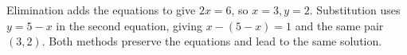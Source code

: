 Elimination adds the equations to give $2x=6$, so $x=3,y=2$. Substitution uses $y=5-x$ in the second equation, giving $x-(5-x)=1$ and the same pair $\boxed{(3,2)}$. Both methods preserve the equations and lead to the same solution.
